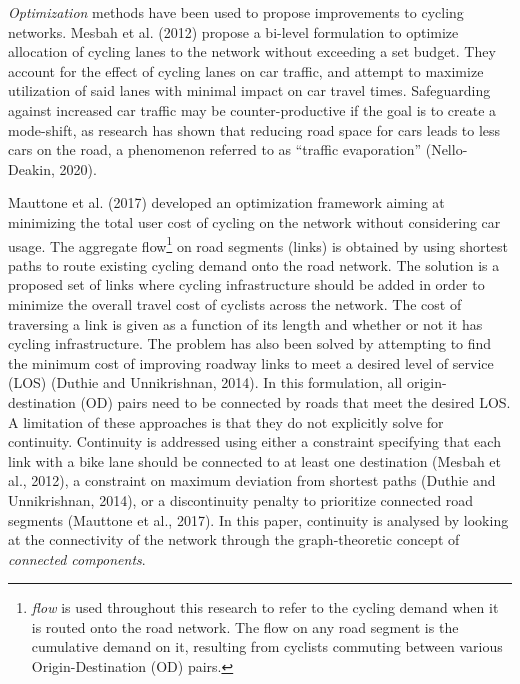 \documentclass[
]{article}
\begin{document}
\emph{Optimization} methods have been used to propose improvements to cycling networks.
Mesbah et al. (2012) propose a bi-level formulation to optimize allocation of cycling lanes to the network without exceeding a set budget.
They account for the effect of cycling lanes on car traffic, and attempt to maximize utilization of said lanes with minimal impact on car travel times.
Safeguarding against increased car traffic may be counter-productive if the goal is to create a mode-shift, as research has shown that reducing road space for cars leads to less cars on the road, a phenomenon referred to as ``traffic evaporation'' (Nello-Deakin, 2020).

Mauttone et al. (2017) developed an optimization framework aiming at minimizing the total user cost of cycling on the network without considering car usage.
The aggregate flow\footnote{\emph{flow} is used throughout this research to refer to the cycling demand when it is routed onto the road network.
  The flow on any road segment is the cumulative demand on it, resulting from cyclists commuting between various Origin-Destination (OD) pairs.} on road segments (links) is obtained by using shortest paths to route existing cycling demand onto the road network.
The solution is a proposed set of links where cycling infrastructure should be added in order to minimize the overall travel cost of cyclists across the network.
The cost of traversing a link is given as a function of its length and whether or not it has cycling infrastructure.
The problem has also been solved by attempting to find the minimum cost of improving roadway links to meet a desired level of service (LOS) (Duthie and Unnikrishnan, 2014).
In this formulation, all origin-destination (OD) pairs need to be connected by roads that meet the desired LOS.
A limitation of these approaches is that they do not explicitly solve for continuity.
Continuity is addressed using either a constraint specifying that each link with a bike lane should be connected to at least one destination (Mesbah et al., 2012), a constraint on maximum deviation from shortest paths (Duthie and Unnikrishnan, 2014), or a discontinuity penalty to prioritize connected road segments (Mauttone et al., 2017).
In this paper, continuity is analysed by looking at the connectivity of the network through the graph-theoretic concept of \emph{connected components}.
\end{document}

